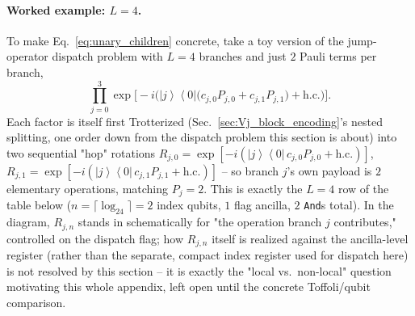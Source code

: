 \documentclass[11pt]{article}
\renewcommand{\ket}[1]{\left| #1 \right\rangle}
\renewcommand{\bra}[1]{\left\langle #1 \right|}
\begin{document}
\paragraph{Worked example: \texorpdfstring{$L=4$}{L=4}.} To make Eq.~\eqref{eq:unary_children} concrete, take a toy version of the jump-operator dispatch problem with $L=4$ branches and just $2$ Pauli terms per branch,
\begin{equation}\label{eq:unary_example_hamiltonian}
    \prod_{j=0}^{3} \exp\!\Big[-i\Big(\ket{j}\bra{0}\big(c_{j,0}P_{j,0}+c_{j,1}P_{j,1}\big)+\text{h.c.}\Big)\Big].
\end{equation}
Each factor is itself first Trotterized (Sec.~\ref{sec:Vj_block_encoding}'s nested splitting, one order down from the dispatch problem this section is about) into two sequential "hop" rotations $R_{j,0}=\exp[-i(\ket{j}\bra0\,c_{j,0}P_{j,0}+\text{h.c.})]$, $R_{j,1}=\exp[-i(\ket{j}\bra0\,c_{j,1}P_{j,1}+\text{h.c.})]$ -- so branch $j$'s own payload is $2$ elementary operations, matching $P_j=2$. This is exactly the $L=4$ row of the table below ($n=\lceil\log_24\rceil=2$ index qubits, $1$ flag ancilla, $2$ \texttt{And}s total). In the diagram, $R_{j,n}$ stands in schematically for "the operation branch $j$ contributes," controlled on the dispatch flag; how $R_{j,n}$ itself is realized against the ancilla-level register (rather than the separate, compact index register used for dispatch here) is not resolved by this section -- it is exactly the "local vs.\ non-local" question motivating this whole appendix, left open until the concrete Toffoli/qubit comparison.
\end{document}
